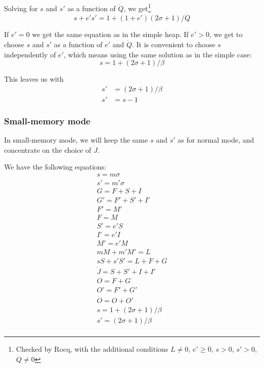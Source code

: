 \documentclass{article}
\begin{document}
Solving for $s$ and $s'$ as a function of $\dot{Q}$, we get\footnote{
Checked by Rocq, with the additional conditions
$L \neq 0$,
$e' \ge 0$,
$s > 0$,
$s' > 0$,
$\dot{Q} \neq 0$
}
\begin{equation} \label{eqn-s'}
s + e' s' = 1 + (1+e') (2\sigma+1)/\dot{Q}
\end{equation}

If $e' = 0$ we get the same equation as in the simple heap. If $e' >
0$, we get to choose $s$ and $s'$ as a function of $e'$ and
$\dot{Q}$. It is convenient to choose $s$ independently of $e'$,
which means using the same solution as in the simple case:
\begin{equation} \label{solution-s'}
s = 1 + (2\sigma+1)/\beta
\end{equation}

This leaves us with
\begin{align}
s' & = (2\sigma+1)/\beta \\
s' & = s - 1
\end{align}


\subsubsection{Small-memory mode}

In small-memory mode, we will keep the same $s$ and $s'$ as for normal
mode, and concentrate on the choice of $\dot{J}$.

We have the following equations:
\begin{gather*}
s = m \sigma \\
s' = m' \sigma \\
G = F + S + I  \\
G' = F' + S' + I'  \\
F' = M'  \\
F = M \\
S' = e'S \\
I' = e'I \\
M' = e'M \\
mM + m'M' = L \\
sS + s'S' = L + F + G \\
\dot{J} = S + S' + I + I'  \\
O = F + G  \\
O' = F' + G' \\
\dot{O} = O + O'  \\
s = 1 + (2\sigma+1)/\beta \\
s' = (2\sigma+1)/\beta \\
\end{gather*}
\end{document}
